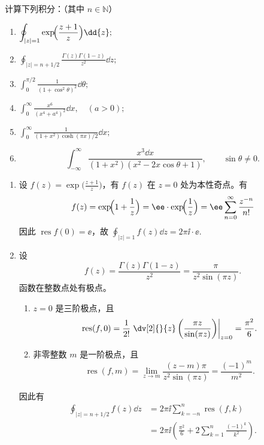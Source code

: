 \begin{question}
计算下列积分：（其中 \(n\in\mathbb{N}\)）

\begin{enumerate}
  \item \(\displaystyle\oint_{|z|=1}\exp\!\Bigl(\frac{z+1}{z}\Bigr)\dd{z};\)

  \item \(\displaystyle\oint_{|z|=n+1/2}\frac{\Gamma(z)\Gamma(1-z)}{z^2}\dd{z};\)

  \item \(\displaystyle\int_0^{\pi/2}\frac{1}{(1+\cos^2\theta)^2}\dd{\theta};\)

  \item \(\displaystyle\int_0^\infty\frac{x^6}{(x^4+a^4)^2}\dd{x},\quad (a>0);\)

  \item \(\displaystyle\int_0^\infty\frac{1}{(1+x^2)\cosh(\pi x)/2}\dd{x};\)

  \item
  \[
  \int_{-\infty}^\infty
  \frac{x^3\dd{x}}{(1+x^2)(x^2-2x\cos\theta+1)},
  \qquad \sin\theta\ne0.
  \]

\end{enumerate}
\begin{solution}
\begin{enumerate}
  \item 设 \(f(z)=\exp\!\bigl(\frac{z+1}{z}\bigr)\)，有 \(f(z)\) 在 \(z=0\) 处为本性奇点。有
\[
f(z)=\exp\!\Bigl(1+\frac1z\Bigr)=\ee\cdot\exp\!\Bigl(\frac1z\Bigr)=\ee\sum_{n=0}^\infty\frac{z^{-n}}{n!}
\]
因此 \(\operatorname{res}f(0)=\ee\)，故 \(\displaystyle\oint_{|z|=1}f(z)\dd{z}=2\pi\ii\cdot\ee\).

  \item 设
  \[
  f(z)=\frac{\Gamma(z)\Gamma(1-z)}{z^2}
  =\frac{\pi}{z^2\sin(\pi z)}.
  \]
  函数在整数点处有极点。
  \begin{enumerate}
    \item \(z=0\) 是三阶极点，且
    \[
    \operatorname{res}(f,0)
    =\frac1{2!}\left.\dv[2]{}{z}
    \left(\frac{\pi z}{\sin(\pi z)}\right)\right|_{z=0}
    =\frac{\pi^2}{6}.
    \]
    \item 非零整数 \(m\) 是一阶极点，且
    \[
    \operatorname{res}(f,m)
    =\lim_{z\to m}\frac{(z-m)\pi}{z^2\sin(\pi z)}
    =\frac{(-1)^m}{m^2}.
    \]
  \end{enumerate}
因此有
\[
\begin{aligned}
\oint_{|z|=n+1/2}f(z)\dd{z}
&=2\pi\ii\sum_{k=-n}^{n}\operatorname{res}(f,k)\\
&=2\pi\ii\left(\frac{\pi^2}{6}
+2\sum_{k=1}^{n}\frac{(-1)^k}{k^2}\right).
\end{aligned}
\]


\end{enumerate}
\end{solution}
\end{question}
